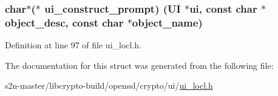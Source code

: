 \subsubsection[{\texorpdfstring{ui\+\_\+construct\+\_\+prompt}{ui_construct_prompt}}]{\setlength{\rightskip}{0pt plus 5cm}char$\ast$($\ast$ ui\+\_\+construct\+\_\+prompt) ({\bf UI} $\ast$ui, const char $\ast$object\+\_\+desc, const char $\ast$object\+\_\+name)}\hypertarget{structui__method__st_a7aa00ed8959cdab8281400dcfbe351b5}{}\label{structui__method__st_a7aa00ed8959cdab8281400dcfbe351b5}


Definition at line 97 of file ui\+\_\+locl.\+h.



The documentation for this struct was generated from the following file\+:\begin{DoxyCompactItemize}
\item 
s2n-\/master/libcrypto-\/build/openssl/crypto/ui/\hyperlink{ui__locl_8h}{ui\+\_\+locl.\+h}\end{DoxyCompactItemize}
